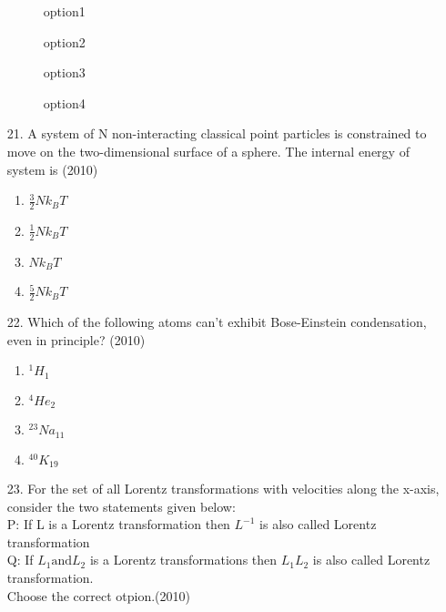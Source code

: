 \documentclass[journal]{IEEEtran}
\begin{document}
\begin{enumerate}
\begin{figure}[!ht]
        \caption{option1}
    \end{figure}
    \begin{figure}[!ht]
        \centering
        \caption{option2}
    \end{figure}
    \begin{figure}[!ht]
        \centering
        \caption{option3}
    \end{figure}
    \begin{figure}[!ht]
        \centering
        \caption{option4}
    \end{figure}
    \item[21.] A system of N non-interacting classical point particles is constrained to move on the two-dimensional surface of a sphere. The internal energy of system is \hfill (2010)
    \begin{enumerate}[label=(\Alph*)]
        \item $\frac{3}{2}Nk_BT$
        \item $\frac{1}{2}Nk_BT$
        \item $Nk_BT$
        \item $\frac{5}{2}Nk_BT$
    \end{enumerate} 
    \item[22.] Which of the following atoms can't exhibit Bose-Einstein condensation, even in principle? \hfill (2010)
    \begin{enumerate}[label=(\Alph*)]
        \item $^1H_1$
        \item $^4He_2$
        \item $^{23}Na_{11}$
        \item $^{40}K_{19}$
    \end{enumerate}
    \item[23.] For the set of all Lorentz transformations with velocities along the x-axis, consider the two statements given below:\\
     P: If L is a Lorentz transformation then $L^{-1}$ is also called Lorentz transformation
     \\Q: If $L_1 \text{and} L_2$ is a Lorentz transformations then $L_1L_2$ is also called Lorentz transformation.
     \\Choose the correct otpion.\hfill (2010)

\end{enumerate}
\end{document}
